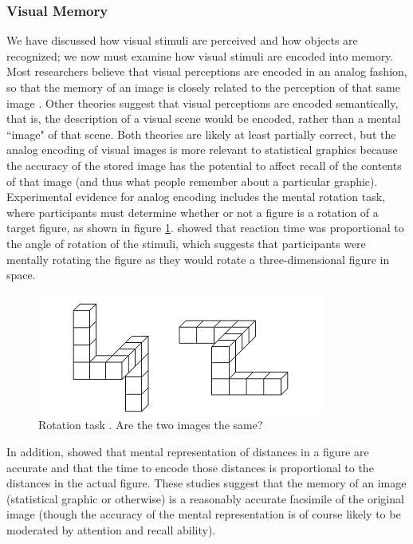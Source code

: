 \documentclass[11pt]{isuthesis}\usepackage[]{graphicx}\usepackage[]{color}
\begin{document}
\subsubsection{Visual Memory}
We have discussed how visual stimuli are perceived and how objects are recognized; we now must examine how visual stimuli are encoded into memory. Most researchers believe that visual perceptions are encoded in an analog fashion, so that the memory of an image is closely related to the perception of that same image \citep{cognition}. Other theories suggest that visual perceptions are encoded semantically, that is, the description of a visual scene would be encoded, rather than a mental ``image" of that scene. Both theories are likely at least partially correct, but the analog encoding of visual images is more relevant to statistical graphics because the accuracy of the stored image has the potential to affect recall of the contents of that image (and thus what people remember about a particular graphic). Experimental evidence for analog encoding includes the mental rotation task, where participants must determine whether or not a figure is a rotation of a target figure, as shown in figure \ref{fig:mentalRotation}. \citet{shepard1988mental} showed that reaction time was proportional to the angle of rotation of the stimuli, which suggests that participants were mentally rotating the figure as they would rotate a three-dimensional figure in space. 

\begin{figure}[htbp]\centering
\includegraphics[width=.7\textwidth]{RotationTask}
\caption[Rotation Task]{Rotation task \protect\citep{shepard1988mental}. Are the two images the same?}\label{fig:mentalRotation}
\end{figure}

In addition, \citet{kosslyn1978visual} showed that mental representation of distances in a figure are accurate and that the time to encode those distances is proportional to the distances in the actual figure. These studies suggest that the memory of an image (statistical graphic or otherwise) is a reasonably accurate facsimile of the original image (though the accuracy of the mental representation is of course likely to be moderated by attention and recall ability). 
\end{document}
